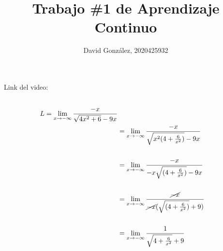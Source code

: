\documentclass{article}
\title{Trabajo \#1 de Aprendizaje Continuo }
\author{David González, 2020425932}
\theoremstyle{mytheoremstyle}
\theoremstyle{mytheoremstyle}
\theoremstyle{myproblemstyle}
\begin{document}
  
\maketitle
Link del video:
\begin{equation*} \label{eq1}
    \begin{split}
    \\L=\lim_{x\to - \infty } \frac{-x}{\sqrt{4x^2+6}-9x}\\
        &=\lim_{x\to - \infty } \frac{-x}{\sqrt{x^2(4+\frac{6}{x^2})}-9x}\\\\
        &=\lim_{x\to - \infty } \frac{-x}{-x\sqrt{(4+\frac{6}{x^2})}-9x}\\\\
        &=\lim_{x\to - \infty } \frac{\cancel{-x}}{\cancel{-x}(\sqrt{(4+\frac{6}{x^2})}+9)}\\\\
        &=\lim_{x\to - \infty } \frac{1}{\sqrt{4+\frac{6}{x^2}}+9}\\\\
    \end{split}
\end{equation*}
\end{document}

